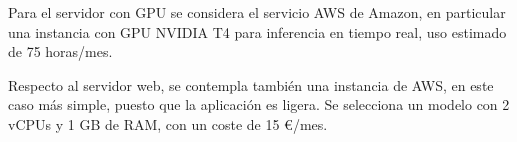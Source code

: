 Para el servidor con GPU se considera el servicio AWS de Amazon, en particular una instancia con GPU NVIDIA T4 para inferencia en tiempo real, 
uso estimado de 75 horas/mes.

Respecto al servidor web, se contempla también una instancia de AWS, en este caso más simple, puesto que la aplicación es ligera. Se selecciona un 
modelo con 2 vCPUs y 1 GB de RAM, con un coste de 15 €/mes.